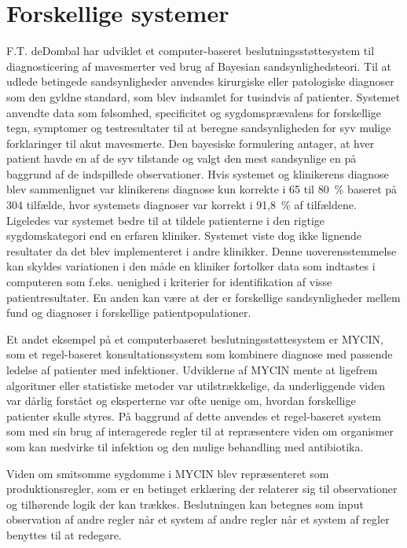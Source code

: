 \section{Forskellige systemer}
F.T. deDombal har udviklet et computer-baseret beslutningsstøttesystem til diagnosticering af mavesmerter ved brug af Bayesian sandsynlighedsteori. Til at udlede betingede  sandsynligheder anvendes kirurgiske eller patologiske diagnoser som den gyldne standard, som blev indsamlet for tusindvis af patienter. Systemet anvendte data som følsomhed, specificitet og sygdomsprævalens for forskellige tegn, symptomer og testresultater til at beregne sandsynligheden for syv mulige forklaringer til akut mavesmerte. Den bayesiske formulering antager, at hver patient havde en af de syv tilstande og valgt den mest sandsynlige en på baggrund af de indspillede observationer. Hvis systemet og klinikerens diagnose blev sammenlignet var klinikerens diagnose kun korrekte i 65 til 80~\% baseret på 304 tilfælde, hvor systemets diagnoser var korrekt i 91,8~\% af tilfældene. Ligeledes var systemet bedre til at tildele patienterne i den rigtige sygdomskategori end en erfaren kliniker. Systemet viste dog ikke lignende resultater da det blev implementeret i andre klinikker. Denne uoverensstemmelse kan skyldes variationen i den måde en kliniker fortolker data som indtastes i computeren som f.eks. uenighed i kriterier for identifikation af visse patientresultater. En anden kan være at der er forskellige sandsynligheder mellem fund og diagnoser i forskellige patientpopulationer. 

Et andet eksempel på et computerbaseret beslutningsstøttesystem er MYCIN, som et regel-baseret konsultationssystem som kombinere diagnose med passende ledelse af patienter med infektioner. Udviklerne af MYCIN mente at ligefrem algoritmer eller statistiske metoder var utilstrækkelige, da underliggende viden var dårlig forstået og eksperterne var ofte uenige om, hvordan forskellige patienter skulle styres. På baggrund af dette anvendes et regel-baseret system som med sin brug af interagerede regler til at repræsentere viden om organismer som kan medvirke til infektion og den mulige behandling med antibiotika. 

Viden om smitsomme sygdomme i MYCIN blev repræsenteret som produktionsregler, som er en betinget erklæring der relaterer sig til observationer og tilhørende logik der kan trækkes. Beslutningen kan betegnes som input observation af andre regler når et system af andre regler når et system af regler benyttes til at redegøre.

